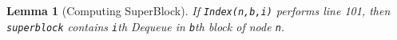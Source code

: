 \documentclass[10pt]{article}
\renewcommand{\tt}[1]{\texttt{#1}}
\newtheorem{lemma}[theorem]{Lemma}
\theoremstyle{definition}
\begin{document}
\begin{lemma}[Computing SuperBlock]\label{superBlock}
  If \tt{Index(n,b,i)} performs line 101, then \tt{superblock} contains \tt{i}th Dequeue in \tt{b}th block of node \tt{n}.
\end{lemma}
%
%
%
%
\end{document}
